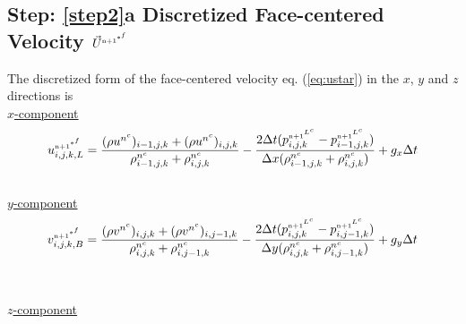 \documentclass[fleqn]{article}
\begin{document}
{\subsection{Step: \ref{step2}a  \textsf{Discretized Face-centered Velocity $\vec{U}^{\nadv^{*^{f}}}$}}
The discretized form of the face-centered velocity eq. (\ref{eq:ustar})
in the $x$, $y$ and $z$ directions is\\
%
\underline{\textsf{$x$-component}}
\begin{equation*}
    u^{\nadv^{*^f}}_{i,j,k,L}= \frac{(\rho \uvelnc)_{i-1,j,k} + (\rho \uvelnc)_{i,j,k}}{
    \rhonc_{i-1,j,k} + \rhonc_{i,j,k} }
-   \frac{ 2\delt(\pnnLc_{i,j,k} - \pnnLc_{i-1,j,k} ) }{\delx(\rhonc_{i-1,j,k} +  \rhonc_{i,j,k})}
    +  g_x \delt 
\end{equation*}
%
 \\
%
\underline{\textsf{$y$-component}}
\begin{equation*}
    v^{\nadv^{*^f}}_{i,j,k,B}= \frac{(\rho \vvelnc)_{i,j,k} + (\rho \vvelnc)_{i,j-1,k}}{
    \rhonc_{i,j,k} + \rhonc_{i,j-1,k} }
-   \frac{ 2\delt(\pnnLc_{i,j,k} - \pnnLc_{i,j-1,k} ) }{\dely(\rhonc_{i,j,k} + \rhonc_{i,j-1,k})}
    + g_y \delt 
\end{equation*}
\\
%
\\
%
\underline{\textsf{$z$-component}}
\begin{equation*}

\end{equation*}}
\end{document}

